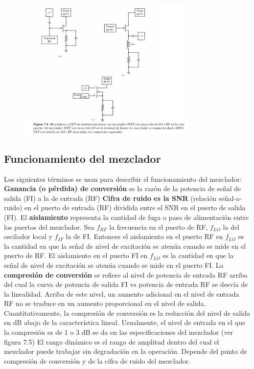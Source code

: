 \documentclass[a4paper,12pt,twoside]{article}
\begin{document}
\begin{figure}[H]
    \centering
    \includegraphics[width=0.8\textwidth]{../img/mezclador3.png}
\end{figure}


\subsection{Funcionamiento del mezclador}

Los siguientes términos se usan para describir el funcionamiento del mezclador:
\newline
\textbf{Ganancia (o pérdida) de conversión} es la razón de la potencia de señal de salida (FI) a la de entrada
(RF)
\newline
\textbf{Cifra de ruido es la SNR} (relación señal-a-ruido) en el puerto de entrada (RF) dividida entre el SNR en
el puerto de salida (FI).
\newline
El \textbf{aislamiento} representa la cantidad de fuga o paso de alimentación entre los puertos del mezclador. Sea $f_{RF}$ la frecuencia en el puerto de RF, $f_{LO}$ la del oscilador local y $f_{IF}$ la de FI. Entonces el aislamiento
 en el puerto RF en $f_{LO}$ es la cantidad en que la señal de nivel de excitación se atenúa cuando se
mide en el puerto de RF. El aislamiento en el puerto FI en $f_{LO}$ es la cantidad en que la señal de nivel
de excitación se atenúa cuando se mide en el puerto FI.
\newline
La \textbf{compresión de conversión} se refiere al nivel de potencia de entrada RF arriba del cual la curva de
potencia de salida FI vs potencia de entrada RF se desvía de la linealidad. Arriba de este nivel, un aumento
 adicional en el nivel de entrada RF no se traduce en un aumento proporcional en el nivel de salida. 
Cuantitativamente, la compresión de conversión es la reducción del nivel de salida en dB abajo de la
característica lineal. Usualmente, el nivel de entrada en el que la compresión es de 1 o 3 dB se da en las
especificaciones del mezclador (ver figura 7.5)
El rango dinámico es el rango de amplitud dentro del cual el mezclador puede trabajar sin degradación
en la operación. Depende del punto de compresión de conversión y de la cifra de ruido del mezclador.
\end{document}
